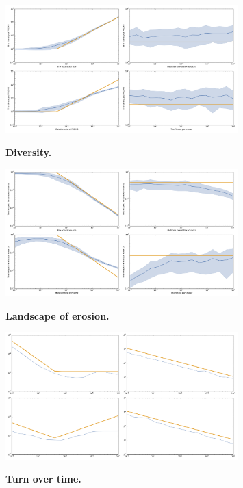\documentclass{article}
\begin{document}
\begin{figure}[!ht]
	  \centering
       \includegraphics[width=0.8\textwidth]{Images/small-load-prdm9-diversity.pdf}\\
		\caption{ \textbf{ Diversity.} 
}
\end{figure}

\begin{figure}[!ht]
	  \centering
       \includegraphics[width=0.8\textwidth]{Images/small-load-landscape-variance.pdf}\\
		\caption{ \textbf{ Landscape of erosion.} 
}
\end{figure}

\begin{figure}[!ht]
	  \centering
       \includegraphics[width=0.8\textwidth]{Images/small-load-turn-over.pdf}\\
		\caption{ \textbf{ Turn over time.} 
}
\end{figure}
\end{document}

